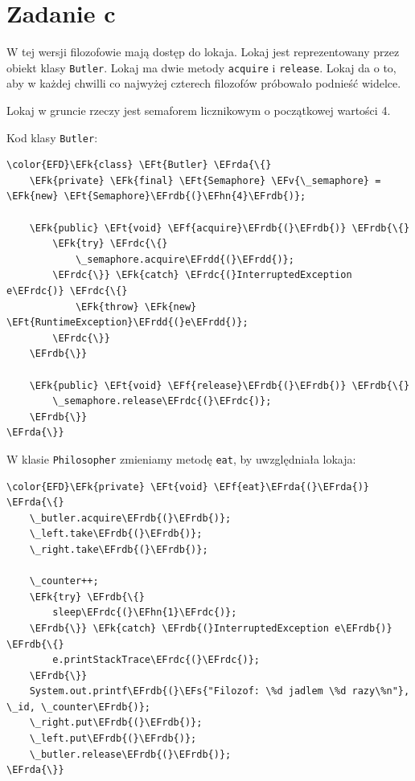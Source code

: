 \documentclass[11pt]{article}
\newcommand{\EFs}[1]{\textcolor{EFs}{#1}} %
\newcommand{\EFk}[1]{\textcolor{EFk}{#1}} %
\newcommand{\EFf}[1]{\textcolor{EFf}{#1}} %
\newcommand{\EFv}[1]{\textcolor{EFv}{#1}} %
\newcommand{\EFt}[1]{\textcolor{EFt}{#1}} %
\newcommand{\EFhn}[1]{\textcolor{EFhn}{#1}} %
\newcommand{\EFrda}[1]{\textcolor{EFrda}{#1}} %
\newcommand{\EFrdb}[1]{\textcolor{EFrdb}{#1}} %
\newcommand{\EFrdc}[1]{\textcolor{EFrdc}{#1}} %
\newcommand{\EFrdd}[1]{\textcolor{EFrdd}{#1}} %
\begin{document}
\section*{Zadanie c}
\label{sec:org6ccceb4}
W tej wersji filozofowie mają dostęp do lokaja.
Lokaj jest reprezentowany przez obiekt klasy \texttt{Butler}. Lokaj ma dwie metody \texttt{acquire} i \texttt{release}.
Lokaj da o to, aby w każdej chwilli co najwyżej czterech filozofów próbowało podnieść widelce.

Lokaj w gruncie rzeczy jest semaforem licznikowym o początkowej wartości 4.

Kod klasy \texttt{Butler}:
\begin{Code}
\begin{Verbatim}
\color{EFD}\EFk{class} \EFt{Butler} \EFrda{\{}
    \EFk{private} \EFk{final} \EFt{Semaphore} \EFv{\_semaphore} = \EFk{new} \EFt{Semaphore}\EFrdb{(}\EFhn{4}\EFrdb{)};

    \EFk{public} \EFt{void} \EFf{acquire}\EFrdb{(}\EFrdb{)} \EFrdb{\{}
        \EFk{try} \EFrdc{\{}
            \_semaphore.acquire\EFrdd{(}\EFrdd{)};
        \EFrdc{\}} \EFk{catch} \EFrdc{(}InterruptedException e\EFrdc{)} \EFrdc{\{}
            \EFk{throw} \EFk{new} \EFt{RuntimeException}\EFrdd{(}e\EFrdd{)};
        \EFrdc{\}}
    \EFrdb{\}}

    \EFk{public} \EFt{void} \EFf{release}\EFrdb{(}\EFrdb{)} \EFrdb{\{}
        \_semaphore.release\EFrdc{(}\EFrdc{)};
    \EFrdb{\}}
\EFrda{\}}
\end{Verbatim}
\end{Code}

W klasie \texttt{Philosopher} zmieniamy metodę \texttt{eat}, by uwzględniała lokaja:
\begin{Code}
\begin{Verbatim}
\color{EFD}\EFk{private} \EFt{void} \EFf{eat}\EFrda{(}\EFrda{)} \EFrda{\{}
    \_butler.acquire\EFrdb{(}\EFrdb{)};
    \_left.take\EFrdb{(}\EFrdb{)};
    \_right.take\EFrdb{(}\EFrdb{)};

    \_counter++;
    \EFk{try} \EFrdb{\{}
        sleep\EFrdc{(}\EFhn{1}\EFrdc{)};
    \EFrdb{\}} \EFk{catch} \EFrdb{(}InterruptedException e\EFrdb{)} \EFrdb{\{}
        e.printStackTrace\EFrdc{(}\EFrdc{)};
    \EFrdb{\}}
    System.out.printf\EFrdb{(}\EFs{"Filozof: \%d jadlem \%d razy\%n"}, \_id, \_counter\EFrdb{)};
    \_right.put\EFrdb{(}\EFrdb{)};
    \_left.put\EFrdb{(}\EFrdb{)};
    \_butler.release\EFrdb{(}\EFrdb{)};
\EFrda{\}}
\end{Verbatim}
\end{Code}
\end{document}

